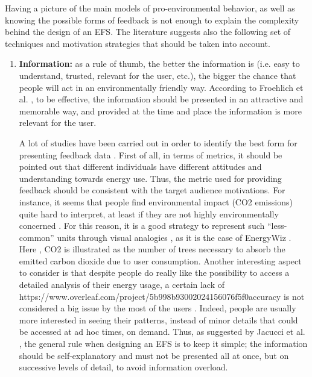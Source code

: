 Having a picture of the main models of pro-environmental behavior, as well as knowing the possible forms of feedback is not enough to explain the complexity behind the design of an \ac{EFS}. The literature suggests also the following set of techniques and motivation strategies that should be taken into account.


\begin{enumerate}
    \item \textbf{Information:} as a rule of thumb, the better the information is (i.e. easy to understand, trusted, relevant for the user, etc.), the bigger the chance that people will act in an environmentally friendly way. According to Froehlich et al. \cite{Froehlich2010}, to be effective, the information should be presented in an attractive and memorable way, and provided at the time and place the information is more relevant for the user.
    
A lot of studies have been carried out in order to identify the best form for presenting feedback data \cite{Fitzpatrick2009, Giulio2009, Petkov2011, Strengers2011}. First of all, in terms of metrics, it should be pointed out that different individuals have different attitudes and understanding towards energy use. Thus, the metric used for providing feedback should be consistent with the target audience motivations. For instance, it seems that people find environmental impact (CO2 emissions) quite hard to interpret, at least if they are not highly environmentally concerned \cite{Fitzpatrick2009}. For this reason, it is a good strategy to represent such “less-common” units through visual analogies \cite{Strengers2011}, as it is the case of EnergyWiz \cite{Petkov2011} . Here , CO2 is illustrated as the number of trees necessary to absorb the emitted carbon dioxide due to user consumption. Another interesting aspect to consider is that despite people do really like the possibility to access a detailed analysis of their energy usage, a certain lack of https://www.overleaf.com/project/5b998b93002024156076f5f0accuracy is not considered a big issue by the most of the users \cite{Fitzpatrick2009}. Indeed, people are usually more interested in seeing their patterns, instead of minor details that could be accessed at ad hoc times, on demand. Thus, as suggested by Jacucci et al. \cite{Giulio2009}, the general rule when designing an \ac{EFS} is to keep it simple; the information should be self-explanatory and must not be presented all at once, but on successive levels of detail, to avoid information overload.


\end{enumerate}

